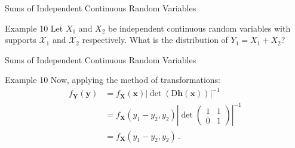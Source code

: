 \documentclass[10pt]{beamer}
\begin{document}
\begin{frame}[fragile]{Sums of Independent Continuous Random Variables}
\begin{exampleblock}{Example 10}
Let \(X_1\) and \(X_2\) be independent continuous random variables with supports \(\mathcal{X}_1\) and \(\mathcal{X}_2\) respectively. What is the distribution of \(Y_1 = X_1 + X_2\)?
\end{exampleblock}
\end{frame}

\begin{frame}[fragile]{Sums of Independent Continuous Random Variables}
\begin{exampleblock}{Example 10}
Now, applying the method of transformations:
\begin{equation*}
    \begin{aligned}
        f_{\bm{Y}}\left(\bm{y}\right) &= f_{\bm{X}}\left(\bm{x}\right)\left|\det\left(\mathrm{D}\bm{h}\left(\bm{x}\right)\right)\right|^{-1}\\
        &= f_{\bm{X}}\left(y_1 - y_2, y_2\right)\left|\det\begin{pmatrix}
            1 & 1\\
            0 & 1
        \end{pmatrix}\right|^{-1}\\
        &= f_{\bm{X}}\left(y_1 - y_2, y_2\right)\,.
    \end{aligned}
\end{equation*}
\end{exampleblock}
\end{frame}
\end{document}
